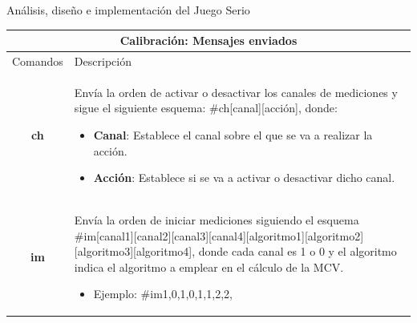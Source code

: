 \begin{thesischapter}{2} {Análisis, diseño e implementación del Juego Serio}
    \newpage
    \vspace*{60pt}
    \begin{table}[h]
        \centering
        \begin{tabular}{ |c|p{14cm}|}
            \hline
            \multicolumn{2}{|c|}{Calibración: Mensajes enviados} \\
            \hline
            Comandos        &   Descripción \\\hline
            \textbf{ch}     &   \begin{minipage}{14cm}
                                    \vspace{1pt}
                                    Envía la orden de activar o desactivar los canales de mediciones y sigue 
                                    el siguiente esquema: \#ch[canal][acción], donde:
                                    \begin{itemize}
                                        \item \textbf{Canal}: Establece el canal sobre el que se va a realizar la acción.
                                        \item \textbf{Acción}: Establece si se va a activar o desactivar dicho canal. 
                                    \end{itemize}
                                    \vspace{1pt}
                                \end{minipage}\\\hline
            \textbf{im}     &   \begin{minipage}{14cm}
                                    \vspace{1pt}
                                    Envía la orden de iniciar mediciones siguiendo el esquema 
                                    \#im[canal1][canal2][canal3][canal4][algoritmo1][algoritmo2][algoritmo3][algoritmo4], 
                                    donde cada canal es 1 o 0 y el algoritmo indica el algoritmo a emplear en el cálculo de la MCV.
                                    \begin{itemize}
                                        \item Ejemplo: \#im1,0,1,0,1,1,2,2,
                                    \end{itemize}   

\end{minipage}
\end{tabular}
\end{table}
\end{thesischapter}
